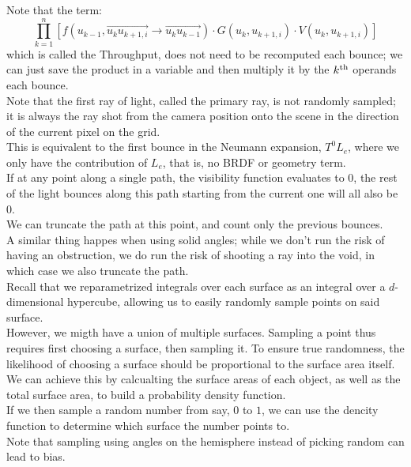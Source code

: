 \documentclass[12pt]{article}
\begin{document}
Note that the term:
\[ \prod_{k=1}^{n} 
\left[ f(u_{k-1}, \overset{\rightarrow}{u_k u_{k+1, i}} 
    \to \overset{\rightarrow}{u_k u_{k-1}})  \cdot 
G(u_k, u_{k+1, i}) \cdot V(u_k, u_{k+1, i}) \right] \]
which is called the Throughput,
does not need to be recomputed each bounce;
we can just save the product in a variable
and then multiply it by the $k^{\text{th}}$
operands each bounce. \\

Note that the first ray of light, called the primary
ray, is not randomly sampled; it is always
the ray shot from the camera position onto the scene
in the direction of the current pixel on the grid. \\
This is equivalent to the first bounce in the Neumann
expansion, $T^0L_e$, where we only have the contribution
of $L_e$, that is, no BRDF or geometry term. \\

If at any point along a single path, the visibility
function evaluates to $0$, the rest of the light
bounces along this path starting from the current one
will all also be $0$. \\
We can truncate the path at this point, and count only
the previous bounces. \\
A similar thing happes when using solid angles;
while we don't run the risk of having an obstruction,
we do run the risk of shooting a ray into the void,
in which case we also truncate the path. \\

Recall that we reparametrized integrals over each
surface as an integral over a $d$-dimensional hypercube,
allowing us to easily randomly sample points on
said surface. \\
However, we migth have a union of multiple surfaces.
Sampling a point thus requires first choosing a surface,
then sampling it. To ensure true randomness, 
the likelihood of choosing a surface should be
proportional to the surface area itself. \\
We can achieve this by calcualting the surface areas
of each object, as well as the total surface area,
to build a probability density function. \\
If we then sample a random number from say, $0$ to $1$,
we can use the dencity function to determine which
surface the number points to. \\

Note that sampling using angles on the hemisphere 
instead of picking random can lead to bias. \\
\end{document}

